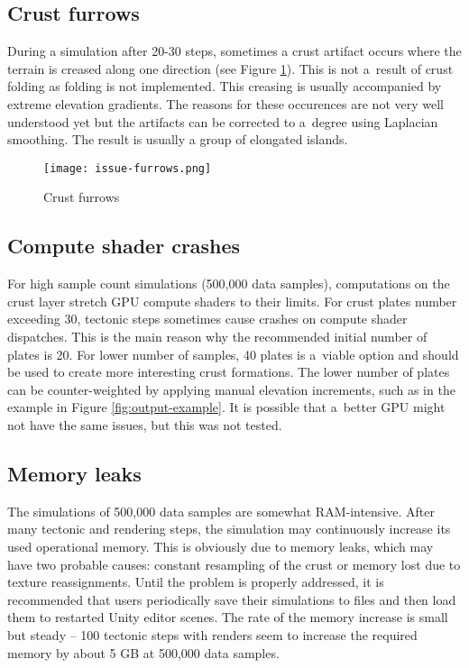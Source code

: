 \subsection{Crust furrows}
During a simulation after 20-30 steps, sometimes a crust artifact occurs where the terrain is creased along one direction (see Figure \ref{fig:crust-furrows}). This is not a~result of crust folding as folding is not implemented. This creasing is usually accompanied by extreme elevation gradients. The reasons for these occurences are not very well understood yet but the artifacts can be corrected to a~degree using Laplacian smoothing. The result is usually a group of elongated islands.
\begin{figure}[ht!]
\centering
\texttt{[image: issue-furrows.png]}
\caption{Crust furrows}
\label{fig:crust-furrows}
\end{figure}

\subsection{Compute shader crashes}
For high sample count simulations (500,000 data samples), computations on the crust layer stretch GPU compute shaders to their limits. For crust plates number exceeding 30, tectonic steps sometimes cause crashes on compute shader dispatches. This is the main reason why the recommended initial number of plates is 20. For lower number of samples, 40 plates is a~viable option and should be used to create more interesting crust formations. The lower number of plates can be counter-weighted by applying manual elevation increments, such as in the example in Figure  \ref{fig:output-example}. It is possible that a~better GPU might not have the same issues, but this was not tested.
\subsection{Memory leaks}
The simulations of 500,000 data samples are somewhat RAM-intensive. After many tectonic and rendering steps, the simulation may continuously increase its used operational memory. This is obviously due to memory leaks, which may have two probable causes: constant resampling of the crust or memory lost due to texture reassignments. Until the problem is properly addressed, it is recommended that users periodically save their simulations to files and then load them to restarted Unity editor scenes. The rate of the memory increase is small but steady -- 100 tectonic steps with renders seem to increase the required memory by about 5 GB at 500,000 data samples.